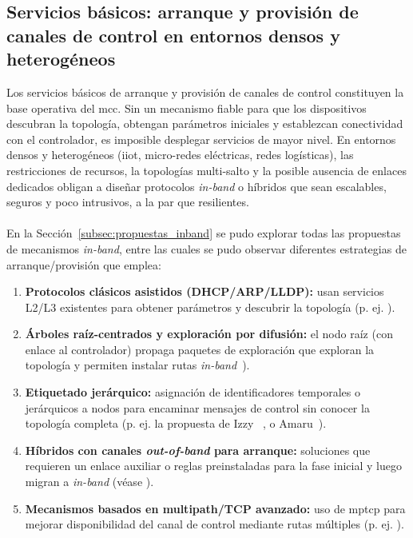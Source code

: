 \subsection{Servicios básicos: arranque y provisión de canales de control en entornos densos y heterogéneos}

Los servicios básicos de arranque y provisión de canales de control constituyen la base operativa del \gls{mcc}. Sin un mecanismo fiable para que los dispositivos descubran la topología, obtengan parámetros iniciales y establezcan conectividad con el controlador, es imposible desplegar servicios de mayor nivel. En entornos densos y heterogéneos (\gls{iiot}, micro-redes eléctricas, redes logísticas), las restricciones de recursos, la topologías multi-salto y la posible ausencia de enlaces dedicados obligan a diseñar protocolos \emph{in-band} o híbridos que sean escalables, seguros y poco intrusivos, a la par que resilientes.\\
\\
En la Sección~\ref{subsec:propuestas_inband} se pudo explorar todas las propuestas de mecanismos \textit{in-band}, entre las cuales se pudo observar diferentes estrategias de arranque/provisión que emplea:

\begin{enumerate}
  \item \textbf{Protocolos clásicos asistidos (DHCP/ARP/LLDP):} usan servicios L2/L3 existentes para obtener parámetros y descubrir la topología (p. ej. \cite{Sharma13}).
  
  \item \textbf{Árboles raíz-centrados y exploración por difusión:} el nodo raíz (con enlace al controlador) propaga paquetes de exploración que exploran la topología y permiten instalar rutas \textit{in-band}~\cite{Lopez-Pajares19}).
  
  \item \textbf{Etiquetado jerárquico:} asignación de identificadores temporales o jerárquicos a nodos para encaminar mensajes de control sin conocer la topología completa (p. ej. la propuesta de Izzy ~\cite{Holzmann19}, o Amaru~\cite{Lopez-Pajares19}).
  
  \item \textbf{Híbridos con canales \textit{out-of-band} para arranque:} soluciones que requieren un enlace auxiliar o reglas preinstaladas para la fase inicial y luego migran a \textit{in-band} (véase \cite{Gonzalez18,Su17}).
  
  \item \textbf{Mecanismos basados en multipath/TCP avanzado:} uso de \gls{mptcp} para mejorar disponibilidad del canal de control mediante rutas múltiples (p. ej. \cite{Raza17}).
  
\end{enumerate}

